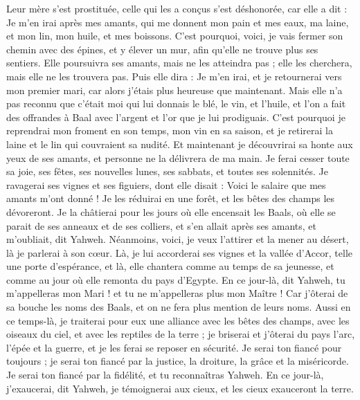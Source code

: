\begin{multicols}{2}
Leur mère s'est prostituée, celle qui les a conçus s'est déshonorée, car elle a dit : Je m'en irai après mes amants, qui me donnent mon pain et mes eaux, ma laine, et mon lin, mon huile, et mes boissons.
C'est pourquoi, voici, je vais fermer son chemin avec des épines, et y élever un mur, afin qu’elle ne trouve plus ses sentiers.
Elle poursuivra ses amants, mais ne les atteindra pas ; elle les cherchera, mais elle ne les trouvera pas. Puis elle dira : Je m'en irai, et je retournerai vers mon premier mari, car alors j'étais plus heureuse que maintenant.
Mais elle n'a pas reconnu que c'était moi qui lui donnais le blé, le vin, et l'huile, et l’on a fait des offrandes à Baal avec l’argent et l’or que je lui prodiguais.
C'est pourquoi je reprendrai mon froment en son temps, mon vin en sa saison, et je retirerai la laine et le lin qui couvraient sa nudité.
Et maintenant je découvrirai sa honte aux yeux de ses amants, et personne ne la délivrera de ma main.
Je ferai cesser toute sa joie, ses fêtes, ses nouvelles lunes, ses sabbats, et toutes ses solennités.
Je ravagerai ses vignes et ses figuiers, dont elle disait : Voici le salaire que mes amants m'ont donné ! Je les réduirai en une forêt, et les bêtes des champs les dévoreront.
Je la châtierai pour les jours où elle encensait les Baals, où elle se parait de ses anneaux et de ses colliers, et s'en allait après ses amants, et m'oubliait, dit Yahweh.
Néanmoins, voici, je veux l'attirer et la mener au désert, là je parlerai à son cœur.
Là, je lui accorderai ses vignes et la vallée d’Accor, telle une porte d’espérance, et là, elle chantera comme au temps de sa jeunesse, et comme au jour où elle remonta du pays d'Egypte.
En ce jour-là, dit Yahweh, tu m'appelleras mon Mari ! et tu ne m'appelleras plus mon Maître !
Car j'ôterai de sa bouche les noms des Baals, et on ne fera plus mention de leurs noms.
Aussi en ce temps-là, je traiterai pour eux une alliance avec les bêtes des champs, avec les oiseaux du ciel, et avec les reptiles de la terre ; je briserai et j'ôterai du pays l'arc, l'épée et la guerre, et je les ferai se reposer en sécurité.
Je serai ton fiancé pour toujours ; je serai ton fiancé par la justice, la droiture, la grâce et la miséricorde.
Je serai ton fiancé par la fidélité, et tu reconnaîtras Yahweh.
En ce jour-là, j’exaucerai, dit Yahweh, je témoignerai aux cieux, et les cieux exauceront la terre.

\end{multicols}
